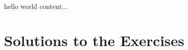 \documentclass[10pt,a4paper]{memoir}
\begin{document}
\begin{noteBox}{hello world}
	content...
\end{noteBox}



\backmatter




\renewenvironment{mySoln}[1]{%
	\vskip .5cm plus 2cm minus 0.1cm%
	{\bfseries \hyperlink{question:#1}{#1.}}%
}%
{%
}%





\chapter{Solutions to the Exercises}


\clearpage
%
\clearpage

%
\clearpage

%
\clearpage
\printindex
\end{document}
